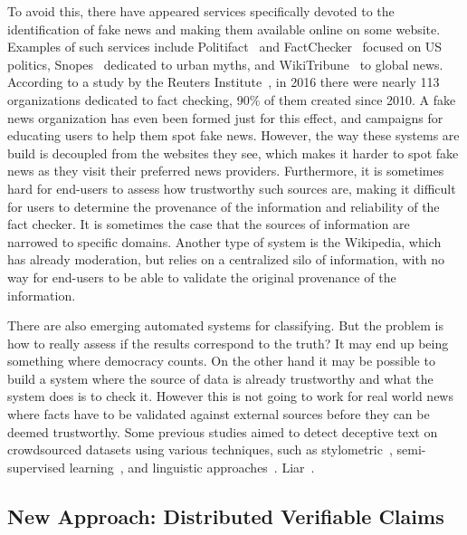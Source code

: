  To avoid this, there have appeared services specifically devoted to the identification of fake news and making them available online on some website. Examples of such services include Politifact~\cite{politifact} and FactChecker~\cite{factchecker} focused on US politics, Snopes~\cite{snopes} dedicated to urban myths, and WikiTribune~\cite{wikitribune} to global news. According to a study by the Reuters Institute~\cite{risefackchecking}, in 2016 there were nearly 113 organizations dedicated to fact checking, 90\% of them created since 2010. A fake news organization has even been formed just for this effect, and campaigns for educating users to help them spot fake news. However, the way these systems are build is decoupled from the websites they see, which makes it harder to spot fake news as they visit their preferred news providers. Furthermore, it is sometimes hard for end-users to assess how trustworthy such sources are, making it difficult for users to determine the provenance of the information and reliability of the fact checker. It is sometimes the case that the sources of information are narrowed to specific domains. Another type of system is the Wikipedia, which has already moderation, but relies on a centralized silo of information, with no way for end-users to be able to validate the original provenance of the information.

 There are also emerging automated systems for classifying. But the problem is how to really assess if the results correspond to the truth? It may end up being something where democracy counts. On the other hand it may be possible to build a system where the source of data is already trustworthy and what the system does is to check it. However this is not going to work for real world news where facts have to be validated against external sources before they can be deemed trustworthy. Some previous studies aimed to detect deceptive text on crowdsourced datasets using various techniques, such as stylometric~\cite{stylometric}, semi-supervised learning~\cite{semisupervised}, and linguistic approaches~\cite{linguistic}. Liar~\cite{liar}.


\subsection{New Approach: Distributed Verifiable Claims}


